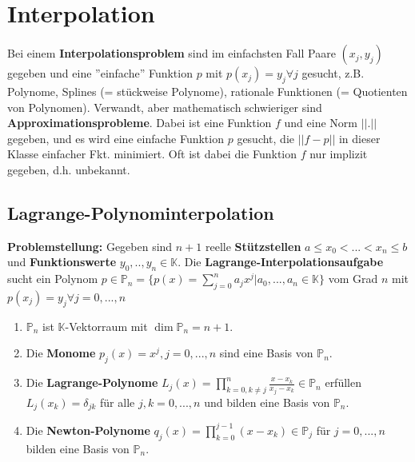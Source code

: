 \section{Interpolation}

Bei einem \textbf{Interpolationsproblem} sind im einfachsten Fall Paare $(x_j, y_j)$ gegeben und eine ''einfache'' Funktion $p$ mit $p(x_j)=y_j \forall j$ gesucht, z.B. Polynome, Splines (= stückweise Polynome), rationale Funktionen (= Quotienten von Polynomen). Verwandt, aber mathematisch schwieriger sind \textbf{Approximationsprobleme}. Dabei ist eine Funktion $f$ und eine Norm $||.||$ gegeben, und es wird eine einfache Funktion $p$ gesucht, die $||f-p||$ in dieser Klasse einfacher Fkt. minimiert. Oft ist dabei die Funktion $f$ nur implizit gegeben, d.h. unbekannt.

\subsection{Lagrange-Polynominterpolation}

\textbf{Problemstellung:} Gegeben sind $n+1$ reelle \textbf{Stützstellen} $a \leq x_0 < ... < x_n \leq b$ und \textbf{Funktionswerte} $y_0, .., y_n \in \mathbb{K}$. Die \textbf{Lagrange-Interpolationsaufgabe} sucht ein Polynom $p \in \mathbb{P}_n = \{p(x)=\sum_{j=0}^{n}a_j x^j | a_0, ..., a_n \in \mathbb{K}\}$ vom Grad $n$ mit $p(x_j) = y_j \forall j=0, ..., n$

\begin{lemma}
	\begin{enumerate}
		\item $\mathbb{P}_n$ ist $\mathbb{K}$-Vektorraum mit $\dim \mathbb{P}_n = n+1$.
		\item Die \textbf{Monome} $p_j(x)=x^j, j=0, ..., n$ sind eine Basis von $\mathbb{P}_n$.
		\item Die \textbf{Lagrange-Polynome} $L_j(x) = \prod_{k=0, k\neq j}^{n} \frac{x-x_k}{x_j-x_k} \in \mathbb{P}_n$ erfüllen $L_j(x_k) = \delta_{jk}$ für alle $j,k=0, ..., n$ und bilden eine Basis von $\mathbb{P}_n$.
		\item Die \textbf{Newton-Polynome} $q_j(x) = \prod_{k=0}^{j-1} (x-x_k) \in \mathbb{P}_j$ für $j=0, ..., n$ bilden eine Basis von $\mathbb{P}_n$.
	\end{enumerate}
\end{lemma}

